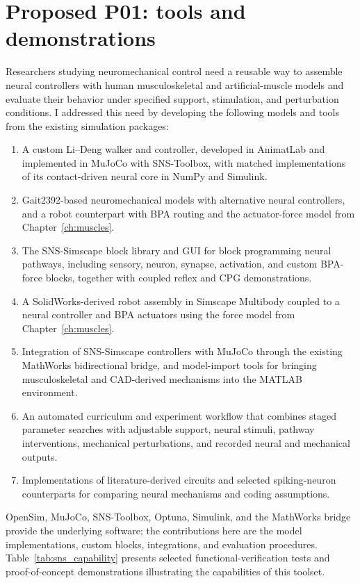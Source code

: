 \documentclass[12pt]{article}
\begin{document}
\section*{Proposed P01: tools and demonstrations}
Researchers studying neuromechanical control need a reusable way to assemble neural controllers with human musculoskeletal and artificial-muscle models and evaluate their behavior under specified support, stimulation, and perturbation conditions. I addressed this need by developing the following models and tools from the existing simulation packages:
\begin{enumerate}
    \item A custom Li--Deng walker and controller, developed in AnimatLab and implemented in MuJoCo with SNS-Toolbox, with matched implementations of its contact-driven neural core in NumPy and Simulink.
    \item Gait2392-based neuromechanical models with alternative neural controllers, and a robot counterpart with BPA routing and the actuator-force model from Chapter~\ref{ch:muscles}.
    \item The SNS-Simscape block library and GUI for block programming neural pathways, including sensory, neuron, synapse, activation, and custom BPA-force blocks, together with coupled reflex and CPG demonstrations.
    \item A SolidWorks-derived robot assembly in Simscape Multibody coupled to a neural controller and BPA actuators using the force model from Chapter~\ref{ch:muscles}.
    \item Integration of SNS-Simscape controllers with MuJoCo through the existing MathWorks bidirectional bridge, and model-import tools for bringing musculoskeletal and CAD-derived mechanisms into the MATLAB environment.
    \item An automated curriculum and experiment workflow that combines staged parameter searches with adjustable support, neural stimuli, pathway interventions, mechanical perturbations, and recorded neural and mechanical outputs.
    \item Implementations of literature-derived circuits and selected spiking-neuron counterparts for comparing neural mechanisms and coding assumptions.
\end{enumerate}
OpenSim, MuJoCo, SNS-Toolbox, Optuna, Simulink, and the MathWorks bridge provide the underlying software; the contributions here are the model implementations, custom blocks, integrations, and evaluation procedures. Table~\ref{tab:sns_capability} presents selected functional-verification tests and proof-of-concept demonstrations illustrating the capabilities of this toolset.
\end{document}
